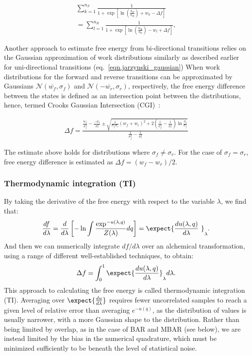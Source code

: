 \begin{eqnarray}
 \sum_{k=1}^{n_F} \frac{1}{1 + \exp[\ln(\frac{n_F}{n_R}) + w_{k} - \Delta f]} \nonumber \\
 =\sum_{l=1}^{n_R} \frac{1}{1 + \exp[\ln(\frac{n_R}{n_F}) - w_{l} + \Delta f]}, \label{eq:bar_noneq}
\end{eqnarray}

Another approach to estimate free energy from bi-directional transitions relies on the Gaussian approximation of work distributions similarly as described earlier for uni-directional transitions (eq.~\ref{eqn.jarzynski_gaussian})
When work distributions for the forward and reverse transitions can be approximated by Gaussians $\mathcal{N}(\overline{w_f},\sigma_f)$ and $\mathcal{N}(-\overline{w_r},\sigma_r)$, respectively, the free energy difference between the states is defined as an intersection point between the distributions, hence, termed Crooks Gaussian Intersection (CGI)~\cite{goette2009accuracy}:

\begin{eqnarray}\label{eq:cgi_noneq}
 \Delta f = \frac{\frac{w_f}{\sigma_f^2}-\frac{-w_r}{\sigma_r^2}\pm\sqrt{\frac{1}{\sigma_f\sigma_r}(w_f+w_r)^2+2(\frac{1}{\sigma_f^2}-\frac{1}{\sigma_r^2})\ln{\frac{\sigma_r}{\sigma_f}}}}{\frac{1}{\sigma_f^2}-\frac{1}{\sigma_r^2}}
\end{eqnarray}

The estimate above holds for distributions where $\sigma_f \neq \sigma_r$.
For the case of $\sigma_f=\sigma_r$, free energy difference is estimated as $\Delta f = (w_f-w_r)/2$.

\subsubsection{Thermodynamic integration (TI)}
By taking the derivative of the free energy with respect to the
variable $\lambda$, we find that:
\begin{equation}
\frac{df}{d\lambda} = \frac{d}{d\lambda} \left[-\ln \int \frac{\exp^{-u(\lambda,q)}}{Z(\lambda)} dq\right] = \expect{\frac{du(\lambda,q)}{d\lambda}\
}_{\lambda} .
\end{equation}
And then we can numerically integrate $df/d\lambda$ over an alchemical transformation, using a range of different well-established techniques, to obtain:
\begin{equation}
\Delta f    = \int_{0}^{1} \expect{\frac{du(\lambda,q)}{d\lambda}}_{\lambda}  d\lambda.    
\end{equation}
This approach to calculating the free energy is called thermodynamic integration (TI). Averaging over $\expect{\frac{du}{d\lambda}}$ requires fewer uncorrelated samples to reach a given level of relative error
than averaging $e^{-u(q)}$, as the distribution of values is usually narrower, with a more Gaussian shape to the distribution. Rather than being limited by overlap, as in the case of BAR and MBAR (see below), we are instead limited by the bias in the numerical quadrature, which must be minimized sufficiently to be beneath the level of statistical noise.

